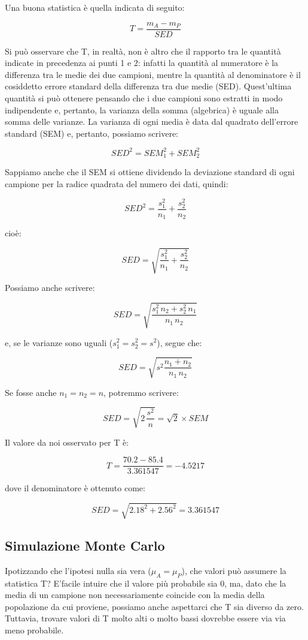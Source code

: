 \documentclass[a4paper,12pt,oneside]{book}
\begin{document}
Una buona statistica è quella indicata di seguito:

\[T = \frac{m_A - m_P}{SED}\]

Si può osservare che T, in realtà, non è altro che il rapporto tra le quantità indicate in precedenza ai punti 1 e 2: infatti la quantità al numeratore è la differenza tra le medie dei due campioni, mentre la quantità al denominatore è il cosiddetto errore standard della differenza tra due medie (SED). Quest'ultima quantità si può ottenere pensando che i due campioni sono estratti in modo indipendente e, pertanto, la varianza della somma (algebrica) è uguale alla somma delle varianze. La varianza di ogni media è data dal quadrato dell'errore standard (SEM) e, pertanto, possiamo scrivere:

\[SED^2 = SEM_1^2 + SEM_2^2\]

Sappiamo anche che il SEM si ottiene dividendo la deviazione standard di ogni campione per la radice quadrata del numero dei dati, quindi:

\[SED^2 = \frac{s_1^2}{n_1} +  \frac{s_2^2}{n_2}\]

cioè:

\[SED = \sqrt{ \frac{s_1^2}{n_1} +  \frac{s_2^2}{n_2} }\]

Possiamo anche scrivere:

\[SED = \sqrt{ \frac{s_1^2 \, n_2 + s_2^2 \, n_1}{n_1 \, n_2} }\]

e, se le varianze sono uguali (\(s_1^2 = s_2^2 = s^2\)), segue che:

\[SED = \sqrt {s^2 \frac{n_1  + n_2}{n_1 \, n_2 } }\]

Se fosse anche \(n_1 = n_2 =n\), potremmo scrivere:

\[SED = \sqrt{2 \, \frac{s^2}{n} } = \sqrt{2} \times SEM\]

Il valore da noi osservato per T è:

\[T = \frac{70.2 - 85.4}{3.361547} = -4.5217\]

dove il denominatore è ottenuto come:

\[SED = \sqrt{ 2.18^2 +  2.56^2 } = 3.361547\]

\hypertarget{simulazione-monte-carlo}{%
\subsection{Simulazione Monte Carlo}\label{simulazione-monte-carlo}}

Ipotizzando che l'ipotesi nulla sia vera (\(\mu_A = \mu_P\)), che valori può assumere la statistica T? E'facile intuire che il valore più probabile sia 0, ma, dato che la media di un campione non necessariamente coincide con la media della popolazione da cui proviene, possiamo anche aspettarci che T sia diverso da zero. Tuttavia, trovare valori di T molto alti o molto bassi dovrebbe essere via via meno probabile.
\end{document}
